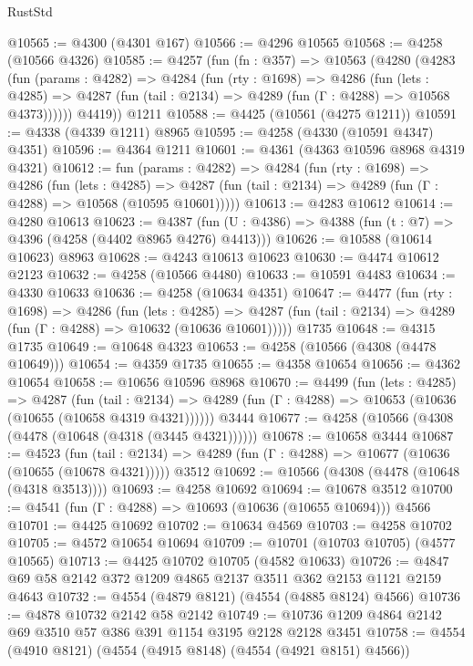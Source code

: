 \begin{lexlean}{RustStd}
\begin{coremodule}
{\begin{coremodule}
{{{{{{{{{{{{{{{{@10565 := @4300 (@4301 @167)
@10566 := @4296 @10565
@10568 := @4258 (@10566 @4326)
@10585 := @4257
    (fun (fn : @357) =>
    @10563
      (@4280
        (@4283
          (fun (params : @4282) =>
          @4284
            (fun (rty : @1698) =>
            @4286
              (fun (lets : @4285) =>
              @4287 (fun (tail : @2134) => @4289 (fun (Γ : @4288) => @10568 @4373))))))
        @4419))
    @1211
@10588 := @4425 (@10561 (@4275 @1211))
@10591 := @4338 (@4339 @1211) @8965
@10595 := @4258 (@4330 (@10591 @4347) @4351)
@10596 := @4364 @1211
@10601 := @4361 (@4363 @10596 @8968 @4319 @4321)
@10612 := fun (params : @4282) =>
  @4284
    (fun (rty : @1698) =>
    @4286
      (fun (lets : @4285) =>
      @4287 (fun (tail : @2134) => @4289 (fun (Γ : @4288) => @10568 (@10595 @10601)))))
@10613 := @4283 @10612
@10614 := @4280 @10613
@10623 := @4387 (fun (U : @4386) => @4388 (fun (t : @7) => @4396 (@4258 (@4402 @8965 @4276) @4413)))
@10626 := @10588 (@10614 @10623) @8963
@10628 := @4243 @10613 @10623
@10630 := @4474 @10612 @2123
@10632 := @4258 (@10566 @4480)
@10633 := @10591 @4483
@10634 := @4330 @10633
@10636 := @4258 (@10634 @4351)
@10647 := @4477
    (fun (rty : @1698) =>
    @4286
      (fun (lets : @4285) =>
      @4287 (fun (tail : @2134) => @4289 (fun (Γ : @4288) => @10632 (@10636 @10601)))))
    @1735
@10648 := @4315 @1735
@10649 := @10648 @4323
@10653 := @4258 (@10566 (@4308 (@4478 @10649)))
@10654 := @4359 @1735
@10655 := @4358 @10654
@10656 := @4362 @10654
@10658 := @10656 @10596 @8968
@10670 := @4499
    (fun (lets : @4285) =>
    @4287
      (fun (tail : @2134) =>
      @4289 (fun (Γ : @4288) => @10653 (@10636 (@10655 (@10658 @4319 @4321))))))
    @3444
@10677 := @4258 (@10566 (@4308 (@4478 (@10648 (@4318 (@3445 @4321))))))
@10678 := @10658 @3444
@10687 := @4523
    (fun (tail : @2134) => @4289 (fun (Γ : @4288) => @10677 (@10636 (@10655 (@10678 @4321)))))
    @3512
@10692 := @10566 (@4308 (@4478 (@10648 (@4318 @3513))))
@10693 := @4258 @10692
@10694 := @10678 @3512
@10700 := @4541 (fun (Γ : @4288) => @10693 (@10636 (@10655 @10694))) @4566
@10701 := @4425 @10692
@10702 := @10634 @4569
@10703 := @4258 @10702
@10705 := @4572 @10654 @10694
@10709 := @10701 (@10703 @10705) (@4577 @10565)
@10713 := @4425 @10702 @10705 (@4582 @10633)
@10726 := @4847 @69 @58 @2142 @372 @1209 @4865 @2137 @3511 @362 @2153 @1121 @2159 @4643
@10732 := @4554 (@4879 @8121) (@4554 (@4885 @8124) @4566)
@10736 := @4878 @10732 @2142 @58 @2142
@10749 := @10736 @1209 @4864 @2142 @69 @3510 @57 @386 @391 @1154 @3195 @2128 @2128 @3451
@10758 := @4554 (@4910 @8121) (@4554 (@4915 @8148) (@4554 (@4921 @8151) @4566))
}}}}}}}}}}}}}}}}
\end{coremodule}}
\end{coremodule}
\end{lexlean}
